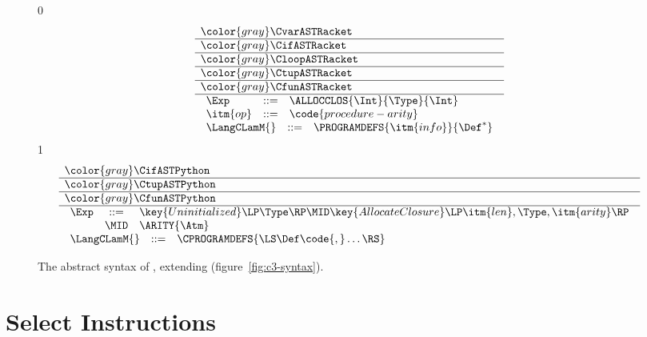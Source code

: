 \documentclass[7x10]{TimesAPriori_MIT}%
\newcommand{\gray}[1]{{\color{gray} #1}}
\def\racketEd{0}
\def\pythonEd{1}
\def\edition{0}
\numberwithin{theorem}{chapter}
\numberwithin{definition}{chapter}
\numberwithin{equation}{chapter}
\begin{document}
\newcommand{\ClambdaASTRacket}{
\begin{array}{lcl}
  \Exp &::= & \ALLOCCLOS{\Int}{\Type}{\Int} \\
  \itm{op} &::= & \code{procedure-arity}
\end{array}
}

\newcommand{\ClambdaASTPython}{
\begin{array}{lcl}
\Exp &::=& \key{Uninitialized}\LP \Type \RP
      \MID \key{AllocateClosure}\LP\itm{len},\Type, \itm{arity}\RP \\
      &\MID& \ARITY{\Atm}
\end{array}
}

\begin{figure}[tp]
  \begin{tcolorbox}[colback=white]
\small
{\if\edition\racketEd
\[
\begin{array}{l}
  \gray{\CvarASTRacket} \\ \hline
  \gray{\CifASTRacket} \\ \hline
  \gray{\CloopASTRacket} \\ \hline
  \gray{\CtupASTRacket} \\ \hline
  \gray{\CfunASTRacket} \\ \hline
  \ClambdaASTRacket \\
\begin{array}{lcl}
\LangCLamM{} & ::= & \PROGRAMDEFS{\itm{info}}{\Def^{*}}
\end{array}
\end{array}
\]
\fi}
{\if\edition\pythonEd
\[
  \begin{array}{l}
  \gray{\CifASTPython} \\ \hline
  \gray{\CtupASTPython} \\ \hline
  \gray{\CfunASTPython} \\ \hline
  \ClambdaASTPython \\
  \begin{array}{lcl}
    \LangCLamM{} & ::= & \CPROGRAMDEFS{\LS\Def\code{,}\ldots\RS} 
  \end{array}
  \end{array}
\]
\fi}
  \end{tcolorbox}

\caption{The abstract syntax of \LangCLam{}, extending \LangCFun{} (figure~\ref{fig:c3-syntax}).}
\label{fig:Clam-syntax}
\end{figure}


\section{Select Instructions}
\label{sec:select-instructions-Llambda}
\end{document}
